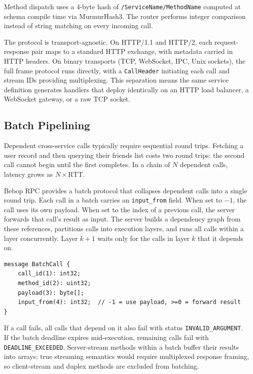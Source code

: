 \documentclass[10pt,onecolumn]{article}
\begin{document}
Method dispatch uses a 4-byte hash of \texttt{/ServiceName/MethodName} computed at schema compile time via MurmurHash3. The router performs integer comparison instead of string matching on every incoming call.

The protocol is transport-agnostic. On HTTP/1.1 and HTTP/2, each request-response pair maps to a standard HTTP exchange, with metadata carried in HTTP headers. On binary transports (TCP, WebSocket, IPC, Unix sockets), the full frame protocol runs directly, with a \texttt{CallHeader} initiating each call and stream IDs providing multiplexing. This separation means the same service definition generates handlers that deploy identically on an HTTP load balancer, a WebSocket gateway, or a raw TCP socket.

\subsection{Batch Pipelining}
\label{sec:batch-pipelining}

Dependent cross-service calls typically require sequential round trips. Fetching a user record and then querying their friends list costs two round trips: the second call cannot begin until the first completes. In a chain of $N$ dependent calls, latency grows as $N \times \text{RTT}$.

Bebop RPC provides a batch protocol that collapses dependent calls into a single round trip. Each call in a batch carries an \texttt{input\_from} field. When set to $-1$, the call uses its own payload. When set to the index of a previous call, the server forwards that call's result as input. The server builds a dependency graph from these references, partitions calls into execution layers, and runs all calls within a layer concurrently. Layer $k+1$ waits only for the calls in layer $k$ that it depends on.

\begin{lstlisting}[language=bebop]
message BatchCall {
    call_id(1): int32;
    method_id(2): uint32;
    payload(3): byte[];
    input_from(4): int32;  // -1 = use payload, >=0 = forward result
}
\end{lstlisting}

If a call fails, all calls that depend on it also fail with status \texttt{INVALID\_ARGUMENT}. If the batch deadline expires mid-execution, remaining calls fail with \texttt{DEADLINE\_EXCEEDED}. Server-stream methods within a batch buffer their results into arrays; true streaming semantics would require multiplexed response framing, so client-stream and duplex methods are excluded from batching.
\end{document}
